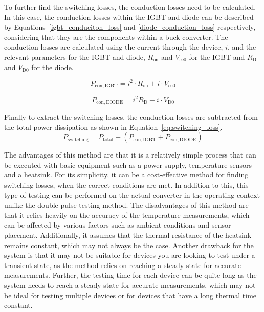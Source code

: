 \documentclass[a4paper, 12pt, titlepage]{report}
\begin{document}
To further find the switching losses, the conduction losses need to be calculated. In this case, the conduction losses within the IGBT and diode can be described by Equations~\ref{igbt_conduciton_loss} and \ref{diode_conduction_loss} respectively, considering that they are the components within a buck converter. The conduction losses are calculated using the current through the device, \(i\), and the relevant parameters for the IGBT and diode, \(R_{\mathrm{on}}\) and \(V_{\mathrm{ce0}}\) for the IGBT and \(R_{\mathrm{D}}\) and \(V_{\mathrm{D0}}\) for the diode.

\begin{equation}
    P_{\mathrm{con, IGBT}} = i^2 \cdot R_{\mathrm{on}} + i \cdot V_{\mathrm{ce0}}
    \label{igbt_conduciton_loss}
\end{equation}

\begin{equation}
    P_{\mathrm{con, DIODE}} = i^2 R_{\mathrm{D}} + i \cdot V_{\mathrm{D0}}
    \label{diode_conduction_loss}
\end{equation}

Finally to extract the switching losses, the conduction losses are subtracted from the total power dissipation as shown in Equation~\ref{eq:switching_loss}.
\begin{equation}
    P_{\mathrm{switching}} = P_{\mathrm{total}} - (P_{\mathrm{con, IGBT}} + P_{\mathrm{con, DIODE}}) 
    \label{eq:switching_loss}
\end{equation}

The advantages of this method are that it is a relatively simple process that can be executed with basic equipment such as a power supply, temperature sensors and a heatsink. For its simplicity, it can be a cost-effective method for finding switching losses, when the correct conditions are met. In addition to this, this type of testing can be performed on the actual converter in the operating context unlike the double-pulse testing method. The disadvantages of this method are that it relies heavily on the accuracy of the temperature measurements, which can be affected by various factors such as ambient conditions and sensor placement. Additionally, it assumes that the thermal resistance of the heatsink remains constant, which may not always be the case. Another drawback for the system is that it may not be suitable for devices you are looking to test under a transient state, as the method relies on reaching a steady state for accurate measurements. Further, the testing time for each device can be quite long as the system needs to reach a steady state for accurate measurements, which may not be ideal for testing multiple devices or for devices that have a long thermal time constant.
\end{document}
